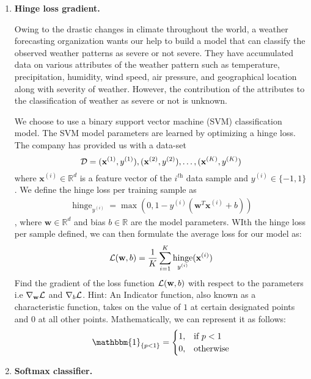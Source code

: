 \documentclass{article}
\newcommand{\R}{\mathbb{R}}
\newcommand{\x}{\bf{x}}
\newcommand{\w}{\bf{w}}
\DeclareMathOperator{\hinge}{hinge}
\renewcommand{\it}[1]{\textit{{#1}}}
\renewcommand{\bf}[1]{\textbf{{#1}}}
\begin{document}
\begin{enumerate}
        \item \bf{Hinge loss gradient.} \vspace{10pt}

            Owing to the drastic changes in climate throughout the world, a weather forecasting 
            organization wants our help to build a model that can classify the observed weather 
            patterns as severe or not severe. They have accumulated data on various attributes of 
            the weather pattern such as temperature, precipitation, humidity, wind speed, air 
            pressure, and geographical location along with severity of weather. However, the 
            contribution of the attributes to the classification of weather as severe or not is unknown. \vspace{10pt}

            We choose to use a binary support vector machine (SVM) classification model. The SVM
            model parameters are learned by optimizing a hinge loss. The company has provided us with
            a data-set
            \[{\cal{D}} = {(\x^{(1)}, y^{(1)}), (\x^{(2)}, y^{(2)}), \ldots, (\x^{(K)}, y^{(K)})}\]
            where $\x^{(i)} \in \R^d$ is a feature vector of the $i^{\it{th}}$ data sample and 
            $y^{(i)} \in \{-1, 1\}$. We define the hinge loss per training sample as
            \begin{align}
                \hinge_{y^{(i)}} = \max \left( 0, 1 - y^{(i)} (\w^T \x^{(i)} + b) \right)
            \end{align}
            , where $\w \in \R^d$ and bias $b \in \R$ are the model parameters. WIth the hinge loss
            per sample defined, we can then formulate the average loss for our model as:
            \begin{align}
                {\cal{L}} (\w, b) = \frac{1}{K} \sum^{K}_{i = 1} \hinge_{y^{(i)}} (\x^{(i)})
            \end{align}
        Find the gradient of the loss function ${\cal{L}} (\w, b)$ with respect to the parameters
        i.e $\nabla_{\w} \cal{L}$ and $\nabla_b \cal{L}$.
        \newline
        Hint: An Indicator function, also known as a characteristic function, takes on the value of
        $1$ at certain designated points and $0$ at all other points. Mathematically, we can represent
        it as follows:
        \begin{align}
            \mathbbm{1}_{\{p < 1\}} = \begin{cases} 1, & \text{if } p < 1 \\ 0, & \text{otherwise} \end{cases}
        \end{align}

    \item \bf{Softmax classifier.}
    \end{enumerate}
\end{document}
